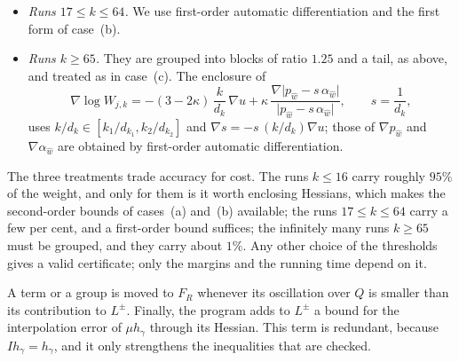 \documentclass[11pt]{amsart}
\theoremstyle{definition}
\theoremstyle{remark}
\newcommand{\abs}[1]{\lvert #1\rvert}
\begin{document}
\begin{itemize}
Across a change of chart, the enclosures of the derivatives of $\vartheta$ are the hulls of those of the two expressions, which is legitimate because $\vartheta$ is $C^{1,1}$. The term is then treated as in case~(a) if the enclosure of $\Phi_{j,k}(Q)$ meets a single cell. Otherwise it is treated as in case~(b), with $\gamma'$ the cell containing the centre of the enclosure, choosing among the two forms of case~(b) and $F_R$ the one with the smallest contribution to $L^\pm$.
\item \emph{Runs $17\le k\le64$.} We use first-order automatic differentiation and the first form of case~(b).
\item \emph{Runs $k\ge65$.} They are grouped into blocks of ratio $1.25$ and a tail, as above, and treated as in case~(c). The enclosure of
\[
  \nabla\log W_{j,k}=-(3-2\kappa)\,\frac k{d_k}\,\nabla u+\kappa\,\frac{\nabla\abs{p_{\hat w}-s\,\alpha_{\hat w}}}{\abs{p_{\hat w}-s\,\alpha_{\hat w}}},\qquad s=\frac1{d_k},
\]
uses $k/d_k\in[k_1/d_{k_1},k_2/d_{k_2}]$ and $\nabla s=-s\,(k/d_k)\nabla u$; those of $\nabla p_{\hat w}$ and $\nabla\alpha_{\hat w}$ are obtained by first-order automatic differentiation.
\end{itemize}
The three treatments trade accuracy for cost. The runs $k\le16$ carry roughly $95\%$ of the weight, and only for them is it worth enclosing Hessians, which makes the second-order bounds of cases~(a) and~(b) available; the runs $17\le k\le64$ carry a few per cent, and a first-order bound suffices; the infinitely many runs $k\ge65$ must be grouped, and they carry about $1\%$. Any other choice of the thresholds gives a valid certificate; only the margins and the running time depend on it.

A term or a group is moved to $F_R$ whenever its oscillation over $Q$ is smaller than its contribution to $L^\pm$. Finally, the program adds to $L^\pm$ a bound for the interpolation error of $\mu h_\gamma$ through its Hessian. This term is redundant, because $Ih_\gamma=h_\gamma$, and it only strengthens the inequalities that are checked.
\end{document}
